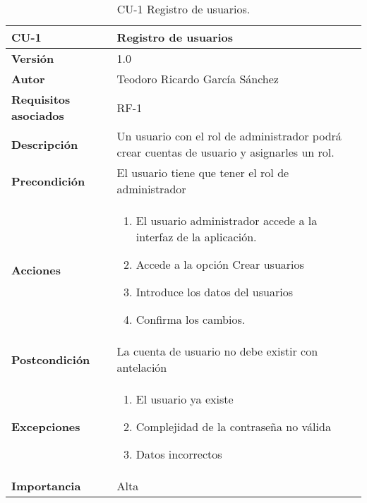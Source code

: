\begin{table}[p]
	\centering
	\begin{tabularx}{\linewidth}{ p{} p{} }
		\toprule
		\textbf{CU-1}    & \textbf{Registro de usuarios}\\
		\toprule
		\textbf{Versión}              & 1.0    \\
		\textbf{Autor}                & Teodoro Ricardo García Sánchez \\
		\textbf{Requisitos asociados} & RF-1 \\
		\textbf{Descripción}          & Un usuario con el rol de administrador podrá crear cuentas de usuario y asignarles un rol. \\
		\textbf{Precondición}         & El usuario tiene que tener el rol de administrador \\
		\textbf{Acciones}             &
		\begin{enumerate}
			\def\labelenumi{\arabic{enumi}.}
			\tightlist
			\item El usuario administrador accede a la interfaz de la aplicación.
			\item Accede a la opción Crear usuarios
			\item Introduce los datos del usuarios
			\item Confirma los cambios.
		\end{enumerate}\\
		\textbf{Postcondición}        & La cuenta de usuario no debe existir con antelación \\
		\textbf{Excepciones}          & 
		\begin{enumerate}
			\item El usuario ya existe
			\item Complejidad de la contraseña no válida
			\item Datos incorrectos
		\end{enumerate}\\
		\textbf{Importancia}          & Alta \\
		\bottomrule
	\end{tabularx}
	\caption{CU-1 Registro de usuarios.}
\end{table}
